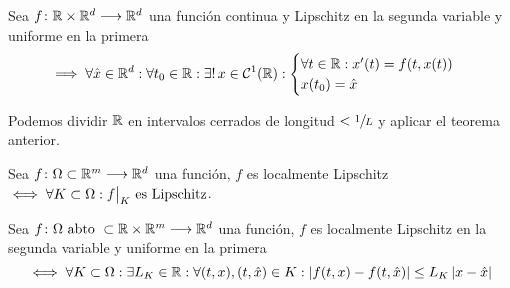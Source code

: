 \begin{cor}
	Sea $f \colon \mathbb{R}\times \mathbb{R}^d \longrightarrow \mathbb{R}^d$ una función continua y Lipschitz en la segunda variable y uniforme en la primera
	\[\implies \forall \hat{x} \in \mathbb{R}^d : \forall t_0 \in \mathbb{R} : \exists! \, x \in \mathcal{C}^1(\mathbb{R}) : \begin{cases}
			\forall t \in \mathbb{R} : x'(t) = f(t, x(t)) \\
			x(t_0) = \hat{x}
		\end{cases}\]
	\begin{dem}
		Podemos dividir $\mathbb{R}$ en intervalos cerrados de longitud $<\sfrac{1}{L}$ y aplicar el teorema anterior.
	\end{dem}
\end{cor}

\begin{defn}
	Sea $f \colon \Omega \subset \mathbb{R}^m \longrightarrow \mathbb{R}^d$ una función, $f$ es localmente Lipschitz $\iff \forall K \subset \Omega : \big.f\big|_K \text{ es Lipschitz}$.
\end{defn}
\begin{defn}
	Sea $f \colon \Omega \text{ abto }\subset \mathbb{R} \times \mathbb{R}^m \longrightarrow \mathbb{R}^d$ una función, $f$ es localmente Lipschitz en la segunda variable y uniforme en la primera
	\[\iff \forall K \subset \Omega : \exists L_K \in \mathbb{R} : \forall (t, x), (t, \hat{x}) \in K : \left|f(t, x) - f(t, \hat{x})\right| \leq L_K \left|x-\hat{x}\right|\]
\end{defn}
